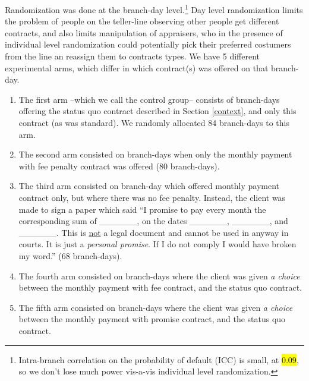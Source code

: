 \documentclass[11pt]{article}
\begin{document}
Randomization was done at the branch-day level.\footnote{Intra-branch correlation on the probability of default (ICC) is small, at \hl{0.09}, so we don't lose much power vis-a-vis individual level randomization.} Day level randomization limits the problem of people on the teller-line observing other people get different contracts, and also limits manipulation of appraisers, who in the presence of individual level randomization could potentially pick their preferred costumers from the line an reassign them to contracts types. We have 5 different experimental arms, which differ in which contract(s) was offered on that branch-day. 

\begin{enumerate}
    \item The first arm --which we call the control group-- consists of branch-days offering the status quo contract described in Section \ref{context}, and only this contract (as was standard). We randomly allocated 84 branch-days to this arm.
    \item The second arm consisted on branch-days when only the monthly payment with fee penalty contract was offered (80 branch-days). 
    \item The third arm consisted on branch-day which offered monthly payment contract only, but where there was no fee penalty. Instead, the client was made to sign a paper which said ``I promise to pay every month the corresponding sum of \_\_\_\_\_\_, on the dates \_\_\_\_\_\_, \_\_\_\_\_\_, and \_\_\_\_\_\_. This is \underline{not} a legal document and cannot be used in anyway in courts. It is just a \textit{personal promise}. If I do not comply I would have broken my word.'' (68 branch-days).
    \item The fourth arm consisted on branch-days where the client was given \textit{a choice} between the monthly payment with fee contract, and the status quo contract. 
    \item The fifth arm consisted on branch-days where the client was given \textit{a choice} between the monthly payment with promise contract, and the status quo contract.
\end{enumerate}
\end{document}
